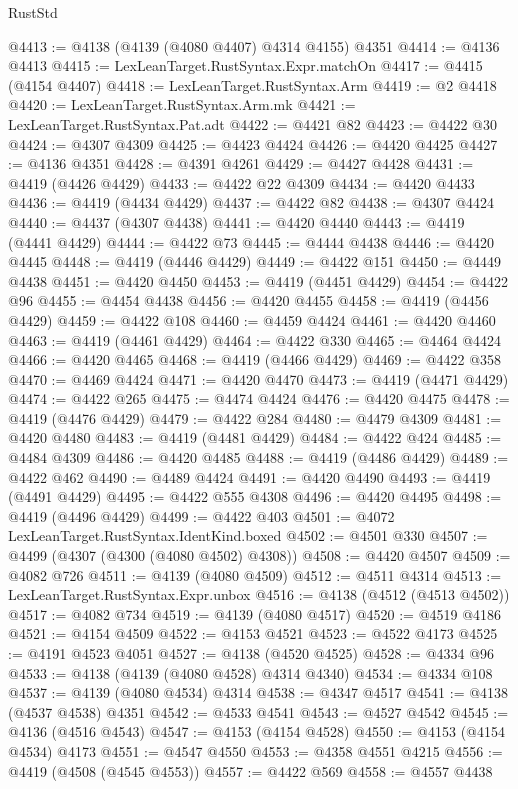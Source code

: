 \begin{lexlean}{RustStd}
\begin{coremodule}
@4413 := @4138 (@4139 (@4080 @4407) @4314 @4155) @4351
@4414 := @4136 @4413
@4415 := LexLeanTarget.RustSyntax.Expr.matchOn
@4417 := @4415 (@4154 @4407)
@4418 := LexLeanTarget.RustSyntax.Arm
@4419 := @2 @4418
@4420 := LexLeanTarget.RustSyntax.Arm.mk
@4421 := LexLeanTarget.RustSyntax.Pat.adt
@4422 := @4421 @82
@4423 := @4422 @30
@4424 := @4307 @4309
@4425 := @4423 @4424
@4426 := @4420 @4425
@4427 := @4136 @4351
@4428 := @4391 @4261
@4429 := @4427 @4428
@4431 := @4419 (@4426 @4429)
@4433 := @4422 @22 @4309
@4434 := @4420 @4433
@4436 := @4419 (@4434 @4429)
@4437 := @4422 @82
@4438 := @4307 @4424
@4440 := @4437 (@4307 @4438)
@4441 := @4420 @4440
@4443 := @4419 (@4441 @4429)
@4444 := @4422 @73
@4445 := @4444 @4438
@4446 := @4420 @4445
@4448 := @4419 (@4446 @4429)
@4449 := @4422 @151
@4450 := @4449 @4438
@4451 := @4420 @4450
@4453 := @4419 (@4451 @4429)
@4454 := @4422 @96
@4455 := @4454 @4438
@4456 := @4420 @4455
@4458 := @4419 (@4456 @4429)
@4459 := @4422 @108
@4460 := @4459 @4424
@4461 := @4420 @4460
@4463 := @4419 (@4461 @4429)
@4464 := @4422 @330
@4465 := @4464 @4424
@4466 := @4420 @4465
@4468 := @4419 (@4466 @4429)
@4469 := @4422 @358
@4470 := @4469 @4424
@4471 := @4420 @4470
@4473 := @4419 (@4471 @4429)
@4474 := @4422 @265
@4475 := @4474 @4424
@4476 := @4420 @4475
@4478 := @4419 (@4476 @4429)
@4479 := @4422 @284
@4480 := @4479 @4309
@4481 := @4420 @4480
@4483 := @4419 (@4481 @4429)
@4484 := @4422 @424
@4485 := @4484 @4309
@4486 := @4420 @4485
@4488 := @4419 (@4486 @4429)
@4489 := @4422 @462
@4490 := @4489 @4424
@4491 := @4420 @4490
@4493 := @4419 (@4491 @4429)
@4495 := @4422 @555 @4308
@4496 := @4420 @4495
@4498 := @4419 (@4496 @4429)
@4499 := @4422 @403
@4501 := @4072 LexLeanTarget.RustSyntax.IdentKind.boxed
@4502 := @4501 @330
@4507 := @4499 (@4307 (@4300 (@4080 @4502) @4308))
@4508 := @4420 @4507
@4509 := @4082 @726
@4511 := @4139 (@4080 @4509)
@4512 := @4511 @4314
@4513 := LexLeanTarget.RustSyntax.Expr.unbox
@4516 := @4138 (@4512 (@4513 @4502))
@4517 := @4082 @734
@4519 := @4139 (@4080 @4517)
@4520 := @4519 @4186
@4521 := @4154 @4509
@4522 := @4153 @4521
@4523 := @4522 @4173
@4525 := @4191 @4523 @4051
@4527 := @4138 (@4520 @4525)
@4528 := @4334 @96
@4533 := @4138 (@4139 (@4080 @4528) @4314 @4340)
@4534 := @4334 @108
@4537 := @4139 (@4080 @4534) @4314
@4538 := @4347 @4517
@4541 := @4138 (@4537 @4538) @4351
@4542 := @4533 @4541
@4543 := @4527 @4542
@4545 := @4136 (@4516 @4543)
@4547 := @4153 (@4154 @4528)
@4550 := @4153 (@4154 @4534) @4173
@4551 := @4547 @4550
@4553 := @4358 @4551 @4215
@4556 := @4419 (@4508 (@4545 @4553))
@4557 := @4422 @569
@4558 := @4557 @4438

\end{coremodule}
\end{lexlean}
